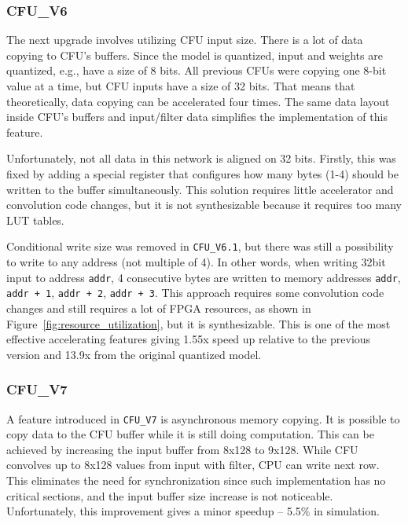 \subsubsection{CFU\_V6} \label{cfu_v6}
The next upgrade involves utilizing CFU input size. There is a lot of data copying to CFU's buffers. Since the model is quantized, input and weights are quantized, e.g., have a size of 8 bits. All previous CFUs were copying one 8-bit value at a time, but CFU inputs have a size of 32 bits. That means that theoretically, data copying can be accelerated four times. The same data layout inside CFU's buffers and input/filter data simplifies the implementation of this feature.

Unfortunately, not all data in this network is aligned on 32 bits. Firstly, this was fixed by adding a special register that configures how many bytes (1-4) should be written to the buffer simultaneously. This solution requires little accelerator and convolution code changes, but it is not synthesizable because it requires too many LUT tables. 

Conditional write size was removed in \verb|CFU_V6.1|, but there was still a possibility to write to any address (not multiple of 4). In other words, when writing 32bit input to address \verb|addr|, 4 consecutive bytes are written to memory addresses \verb|addr|, \verb|addr + 1|, \verb|addr + 2|, \verb|addr + 3|. This approach requires some convolution code changes and still requires a lot of FPGA resources, as shown in Figure~\ref{fig:resource_utilization}, but it is synthesizable. This is one of the most effective accelerating features giving 1.55x speed up relative to the previous version and 13.9x from the original quantized model. 

\subsubsection{CFU\_V7}
A feature introduced in \verb|CFU_V7| is asynchronous memory copying. It is possible to copy data to the CFU buffer while it is still doing computation. This can be achieved by increasing the input buffer from 8x128 to 9x128. While CFU convolves up to 8x128 values from input with filter, CPU can write next row. This eliminates the need for synchronization since such implementation has no critical sections, and the input buffer size increase is not noticeable. Unfortunately, this improvement gives a minor speedup -- 5.5\% in simulation.

